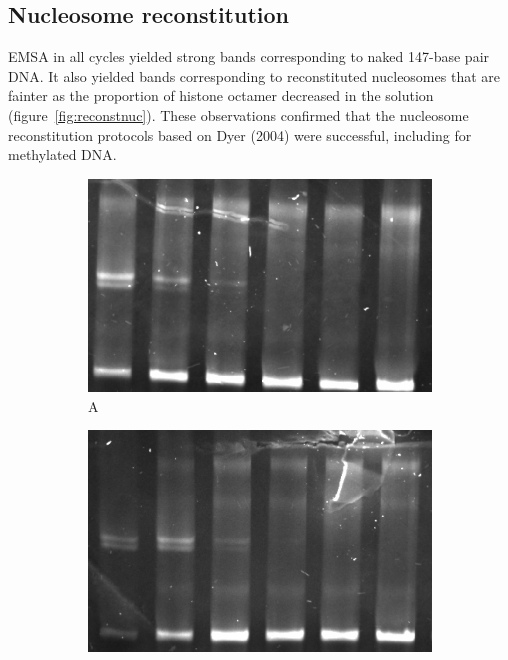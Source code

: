 \documentclass[parskip=full, numbers=noenddot]{scrreprt}
\begin{document}
\subsection{Nucleosome reconstitution}
\label{ssec:reconstnuc}

EMSA in all cycles yielded strong bands corresponding to naked 147-base pair DNA. It also yielded bands corresponding to reconstituted nucleosomes that are fainter as the proportion of histone octamer decreased in the solution (figure~\ref{fig:reconstnuc}). These observations confirmed that the nucleosome reconstitution protocols based on Dyer (2004) were successful, including for methylated DNA.

\begin{figure}[htpb]
  \centering
  \begin{subfigure}[htpb]{0.4\textwidth}
    \centering
    \includegraphics[width=\textwidth]{reconstnuc_a}
    \caption{A}
    \label{fig:reconstnuc_a}
  \end{subfigure}
  \begin{subfigure}[htpb]{0.4\textwidth}
    \centering
    \includegraphics[width=\textwidth]{reconstnuc_b}

\end{subfigure}
\end{figure}
\end{document}

